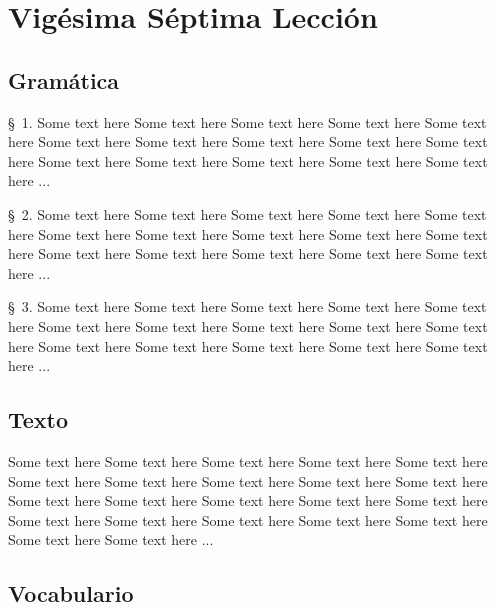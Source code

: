 
\chapter{Vigésima Séptima Lección} %

\label{ch:lesson27} %



\Large{\section*{Gramática}}

\S\ 1. Some text here Some text here Some text here Some text here Some text here Some text here Some text here Some text here Some text here Some text here Some text here Some text here Some text here Some text here Some text here ...

\S\ 2. Some text here Some text here Some text here Some text here Some text here Some text here Some text here Some text here Some text here Some text here Some text here Some text here Some text here Some text here Some text here ...

\S\ 3. Some text here Some text here Some text here Some text here Some text here Some text here Some text here Some text here Some text here Some text here Some text here Some text here Some text here Some text here Some text here ...

\Large{\section*{Texto}}

Some text here Some text here Some text here Some text here Some text here Some text here Some text here Some text here Some text here Some text here Some text here Some text here Some text here Some text here Some text here Some text here Some text here Some text here Some text here Some text here Some text here Some text here ...

\Large{\section*{Vocabulario}}

